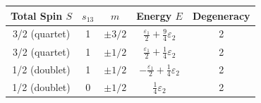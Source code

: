 \documentclass[12pt]{article}
\begin{document}
        \begin{center}
            \renewcommand{\arraystretch}{1.4}
            \begin{tabular}{|c|c|c|c|c|}
                \hline
                Total Spin \( S \) & \( s_{13} \) & \( m \) & Energy \( E \) & Degeneracy \\
                \hline
                3/2 (quartet) & 1 & \( \pm 3/2 \) & \( \frac{\varepsilon_1}{2} + \frac{9}{4} \varepsilon_2 \) & 2 \\
                3/2 (quartet) & 1 & \( \pm 1/2 \) & \( \frac{\varepsilon_1}{2} + \frac{1}{4} \varepsilon_2 \) & 2 \\
                1/2 (doublet) & 1 & \( \pm 1/2 \) & \( -\frac{\varepsilon_1}{2} + \frac{1}{4} \varepsilon_2 \) & 2 \\
                1/2 (doublet) & 0 & \( \pm 1/2 \) & \( \frac{1}{4} \varepsilon_2 \) & 2 \\
                \hline
            \end{tabular}
        \end{center}
\end{document}
